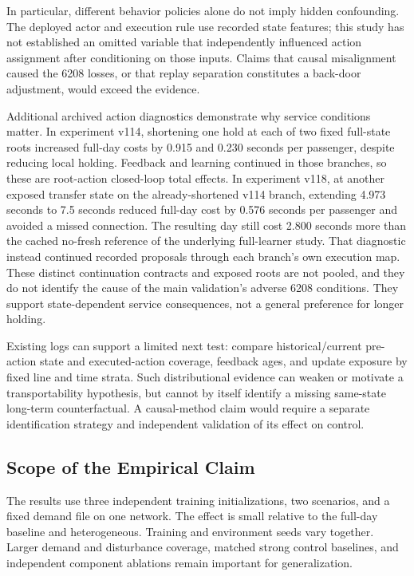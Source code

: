\documentclass[journal]{IEEEtran}
\begin{document}
In particular, different behavior policies alone do not imply hidden confounding. The deployed actor and execution rule use recorded state features; this study has not established an omitted variable that independently influenced action assignment after conditioning on those inputs. Claims that causal misalignment caused the 6208 losses, or that replay separation constitutes a back-door adjustment, would exceed the evidence.

Additional archived action diagnostics demonstrate why service conditions matter. In experiment v114, shortening one hold at each of two fixed full-state roots increased full-day costs by 0.915 and 0.230 seconds per passenger, despite reducing local holding. Feedback and learning continued in those branches, so these are root-action closed-loop total effects. In experiment v118, at another exposed transfer state on the already-shortened v114 branch, extending 4.973 seconds to 7.5 seconds reduced full-day cost by 0.576 seconds per passenger and avoided a missed connection. The resulting day still cost 2.800 seconds more than the cached no-fresh reference of the underlying full-learner study. That diagnostic instead continued recorded proposals through each branch's own execution map. These distinct continuation contracts and exposed roots are not pooled, and they do not identify the cause of the main validation's adverse 6208 conditions. They support state-dependent service consequences, not a general preference for longer holding.

Existing logs can support a limited next test: compare historical/current pre-action state and executed-action coverage, feedback ages, and update exposure by fixed line and time strata. Such distributional evidence can weaken or motivate a transportability hypothesis, but cannot by itself identify a missing same-state long-term counterfactual. A causal-method claim would require a separate identification strategy and independent validation of its effect on control.

\subsection{Scope of the Empirical Claim}
The results use three independent training initializations, two scenarios, and a fixed demand file on one network. The effect is small relative to the full-day baseline and heterogeneous. Training and environment seeds vary together. Larger demand and disturbance coverage, matched strong control baselines, and independent component ablations remain important for generalization.
\end{document}
